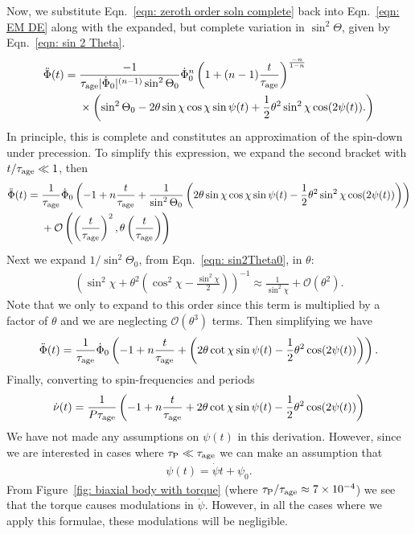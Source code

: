 \documentclass[../full_thesis/full_thesis.tex]{subfiles}
\begin{document}
Now, we substitute Eqn.~\eqref{eqn: zeroth order soln complete} back into
Eqn.~\eqref{eqn: EM DE} along with the expanded, but complete variation in
$\sin^{2}\Theta$, given by Eqn.~\eqref{eqn: sin 2 Theta}.
\begin{align}
\begin{split}
\ddot{\Phi}(t)  = {} & \frac{-1}{\tau_{\mathrm{age}} |\dot{\Phi}_0|^{(n-1)} \sin^{2}\Theta_0}
\dot{\Phi}_0^n\left(1 + (n-1)\frac{t}{\tau_{\mathrm{age}}}\right)^{\frac{-n}{1-n}} \\
& \times \left(\sin^{2}\Theta_0
- 2\theta \sin\chi\cos\chi \sin\psi(t)
 + \frac{1}{2}\theta^{2}\sin^{2}\chi\cos(2\psi(t)).
\right)
\end{split}
\end{align}
In principle, this is complete and constitutes an approximation of the spin-down
under precession.
To simplify this expression, we expand the second bracket with $t/\tau_{\mathrm{age}}\ll1$, then
\begin{align}
\begin{split}
\ddot{\Phi}(t) = {} & \frac{1}{\tau_{\mathrm{age}}} \dot{\Phi}_0
\left(-1 + n\frac{t}{\tau_{\mathrm{age}}} +
\frac{1}{\sin^{2}\Theta_0}\left(
2\theta \sin\chi\cos\chi \sin\psi(t)
- \frac{1}{2}\theta^{2}\sin^{2}\chi\cos(2\psi(t))
\right)\right) \\
& +
\mathcal{O}\left(\left(\frac{t}{\tau_{\mathrm{age}}}\right)^{2},
                 \theta\left(\frac{t}{\tau_{\mathrm{age}}}\right)\right)
\end{split}
\end{align}
Next we expand $1/\sin^{2}\Theta_0$, from Eqn.~\eqref{eqn: sin2Theta0}, in $\theta$:
\begin{align}
\left(\sin^{2}\chi + \theta^{2}\left(\cos^{2}\chi - \frac{\sin^{2}\chi}{2}\right)\right)^{-1}
\approx
\frac{1}{\sin^{2}\chi} + \mathcal{O}(\theta^{2}).
\end{align}
Note that we only to expand to this order since this term is multiplied by a
factor of $\theta$ and we are neglecting $\mathcal{O}(\theta^{3})$ terms.
Then simplifying we have
\begin{align}
\ddot{\Phi}(t) = \frac{1}{\tau_{\mathrm{age}}} \dot{\Phi}_0
\left(-1 + n \frac{t}{\tau_{\mathrm{age}}} +
\left( 2\theta \cot\chi \sin\psi(t)
- \frac{1}{2}\theta^{2}\cos(2\psi(t))
\right)\right).
\end{align}
Finally, converting to spin-frequencies and periods
\begin{align}
\dot{\nu}(t) = \frac{1}{P\tau_{\mathrm{age}}}
\left(-1 + n \frac{t}{\tau_{\mathrm{age}}} +
2\theta \cot\chi \sin\psi(t)
- \frac{1}{2}\theta^{2}\cos(2\psi(t))
\right)
\label{eqn: spin-down rate}
\end{align}
We have not made any assumptions on $\psi(t)$ in this derivation. However, since
we are interested in cases where $\tau_{\mathrm{P}} \ll \tau_{\mathrm{age}}$ we can make an assumption
that
\begin{align}
\psi(t) = \dot{\psi} t + \psi_0.
\end{align}
From Figure~\ref{fig: biaxial body with torque} (where $\tau_{\mathrm{P}}/\tau_{\mathrm{age}} \approx
7\times10^{-4}$) we see that the torque causes modulations in $\dot{\psi}$.
However, in all the cases where we apply this formulae, these modulations will
be negligible.
\end{document}
